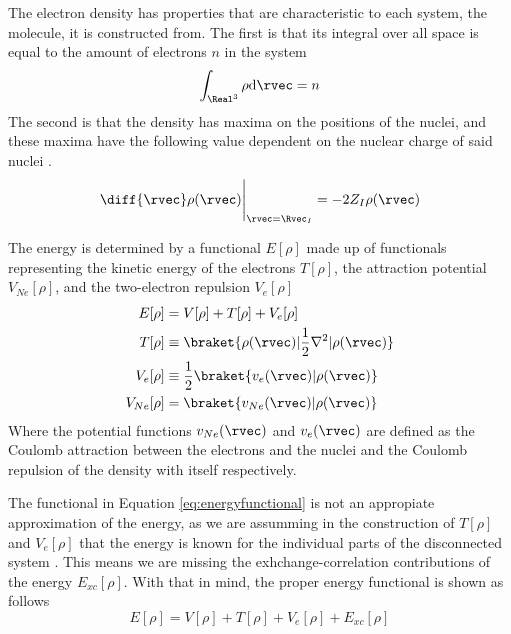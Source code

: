 \documentclass[../master_thesis.tex]{subfiles}
\begin{document}
The electron density has properties that are characteristic to each system, the
molecule,  it is constructed from. The first is that its integral over all space
is equal to the amount of electrons $n$ in the system \cite{Cramer:2004}
\begin{equation}
  \int_{\Real^3}\rho \text{d}\rvec = n
\end{equation}
The second is that the density has maxima on the positions of the nuclei, and
these maxima have the following value dependent on the nuclear charge of said
nuclei \cite{Cramer:2004}.
\begin{equation}
 \diff{\rvec}\rho(\rvec)\Bigg|_{\rvec = \Rvec_I} = -2Z_I\rho(\rvec)
\end{equation}

The energy is determined by a functional $E[\rho]$ made up of functionals representing
the kinetic energy of the electrons $T[\rho]$, the attraction potential $V_{Ne}[\rho]$,
and the two-electron repulsion $V_{e}[\rho]$ \cite{Sorland, PhysRev.136.B864}
\begin{align}\label{eq:energyfunctional}
  E[\rho] &= V[\rho] + T[\rho] + V_{e}[\rho]\\
  T[\rho] &\equiv\braket{\rho(\rvec)| \frac{1}{2}\nabla^2| \rho(\rvec)} \\
  V_{e}[\rho] &\equiv \frac{1}{2}\braket{v_{e}(\rvec)| \rho(\rvec)}\\
  V_{Ne}[\rho] &= \braket{v_{Ne}(\rvec)|\rho(\rvec)}
\end{align}
Where the potential functions $v_{Ne}(\rvec)$  and $v_{e}(\rvec)$ are defined as the Coulomb
attraction between the electrons and the nuclei and the Coulomb repulsion of the
density with itself \cite{Sorland} respectively.

The functional in Equation \ref{eq:energyfunctional} is not an appropiate approximation
of the energy, as we are assumming in the construction of $T[\rho]$ and $V_{e}[\rho]$
that the energy is known for the individual parts of the disconnected system \cite{Sorland}.
This means we are missing the exhchange-correlation contributions of the energy $E_{xc}[\rho]$.
With that in mind, the proper energy functional is shown as follows
\begin{equation}\label{eq:adjustedenergyfunc}
  E[\rho] = V[\rho] + T[\rho] + V_{e}[\rho] + E_{xc}[\rho]
\end{equation}
\end{document}
